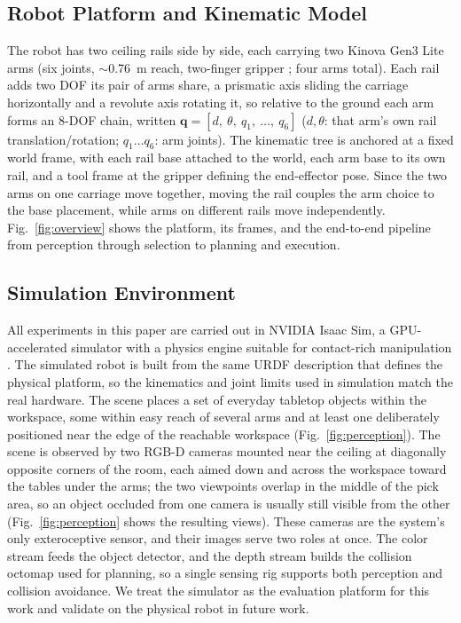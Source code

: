 \documentclass[conference]{IEEEtran}
\begin{document}
\subsection{Robot Platform and Kinematic Model}

The robot has two ceiling rails side by side, each carrying two
Kinova Gen3 Lite arms (six joints, $\sim$0.76~m reach, two-finger gripper
\cite{Kinova}; four arms total). Each rail adds two DOF its pair of arms share, a
prismatic axis sliding the carriage horizontally and a revolute axis rotating it,
so relative to the ground each arm forms an 8-DOF chain, written
$\mathbf{q} = [d,\ \theta,\ q_1,\ \ldots,\ q_6]$ ($d,\theta$: that arm's own rail
translation/rotation; $q_1\ldots q_6$: arm joints). The kinematic tree is anchored
at a fixed world frame, with each rail base attached to the world, each arm base to
its own rail, and a tool frame at the gripper defining the end-effector pose. Since
the two arms on one carriage move together, moving the rail couples the arm choice
to the base placement, while arms on different rails move independently.
Fig.~\ref{fig:overview} shows the platform, its frames, and the end-to-end pipeline
from perception through selection to planning and execution.

\subsection{Simulation Environment}

All experiments in this paper are carried out in NVIDIA Isaac Sim, a GPU-accelerated
simulator with a physics engine suitable for contact-rich manipulation
\cite{IsaacSim2026}. The simulated robot is built from the same URDF
description that defines the physical platform, so the kinematics and joint limits
used in simulation match the real hardware. The scene places a set of everyday
tabletop objects within the workspace, some within easy reach of several arms and at
least one deliberately positioned near the edge of the reachable workspace
(Fig.~\ref{fig:perception}). The scene is observed by two RGB-D
cameras mounted near the ceiling at diagonally opposite corners of the room, each
aimed down and across the workspace toward the tables under the arms; the two
viewpoints overlap in the middle of the pick area, so an object occluded from one
camera is usually still visible from the other (Fig.~\ref{fig:perception} shows
the resulting views). These
cameras are the system's only exteroceptive sensor, and their images serve two
roles at once. The color stream feeds the object detector, and the depth stream builds
the collision octomap used for planning, so a single sensing rig supports both
perception and collision avoidance. We treat the simulator as the evaluation platform
for this work and validate on the physical robot in future work.
\end{document}
